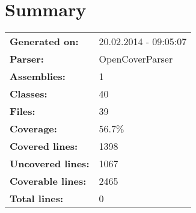 \documentclass[a4paper,10pt]{article}
\begin{document}
\setcounter{secnumdepth}{-1}
\section{Summary}
\begin{longtable}[l]{ll}
\textbf{Generated on:} & 20.02.2014 - 09:05:07\\
\textbf{Parser:} & OpenCoverParser\\
\textbf{Assemblies:} & 1\\
\textbf{Classes:} & 40\\
\textbf{Files:} & 39\\
\textbf{Coverage:} & 56.7\%\\
\textbf{Covered lines:} & 1398\\
\textbf{Uncovered lines:} & 1067\\
\textbf{Coverable lines:} & 2465\\
\textbf{Total lines:} & 0\\
\end{longtable}
\end{document}
